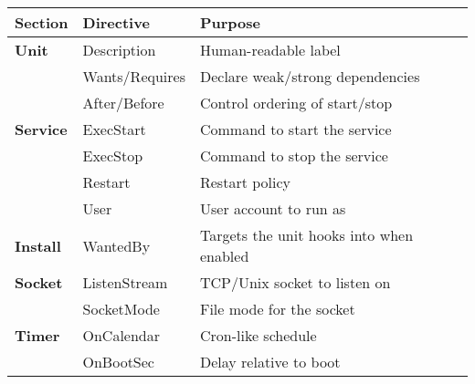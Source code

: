 \documentclass[openany, 12pt]{book}
\begin{document}
\begin{center}
  \begin{tabular}{lll}
    \toprule
    \textbf{Section} & \textbf{Directive} & \textbf{Purpose}                         \\
    \midrule
    \textbf{Unit}
                     & Description        & Human-readable label                     \\
                     & Wants/Requires     & Declare weak/strong dependencies         \\
                     & After/Before       & Control ordering of start/stop           \\
    \midrule
    \textbf{Service}
                     & ExecStart          & Command to start the service             \\
                     & ExecStop           & Command to stop the service              \\
                     & Restart            & Restart policy                           \\
                     & User               & User account to run as                   \\
    \midrule
    \textbf{Install}
                     & WantedBy           & Targets the unit hooks into when enabled \\
    \midrule
    \textbf{Socket}
                     & ListenStream       & TCP/Unix socket to listen on             \\
                     & SocketMode         & File mode for the socket                 \\
    \midrule
    \textbf{Timer}
                     & OnCalendar         & Cron-like schedule                       \\
                     & OnBootSec          & Delay relative to boot                   \\
    \bottomrule
  \end{tabular}
\end{center}
\end{document}
